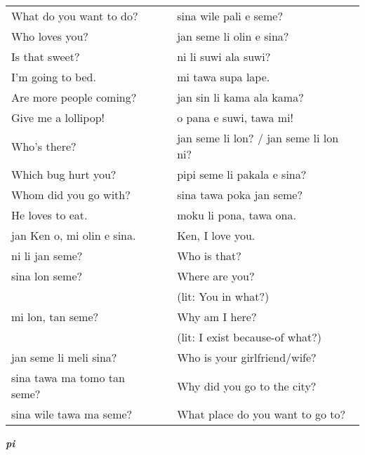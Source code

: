 \begin{supertabular}{p{5,5cm}|ll}
What do you want to do?  && sina wile pali e seme? \\ %
Who loves you?  && jan seme li olin e sina? \\ %
Is that sweet?  && ni li suwi ala suwi? \\ %
I'm going to bed.  && mi tawa supa lape. \\ %
Are more people coming?  && jan sin li kama ala kama? \\ %
Give me a lollipop!  && o pana e suwi, tawa mi! \\ %
Who's there?  && jan seme li lon? / jan seme li lon ni? \\ %
Which bug hurt you?  && pipi seme li pakala e sina? \\ %
Whom did you go with?  && sina tawa poka jan seme? \\ %
He loves to eat.  && moku li pona, tawa ona. \\ %
jan Ken o, mi olin e sina.  && Ken, I love you. \\
ni li jan seme?  && Who is that? \\
sina lon seme?  && Where are you? \\ 
                &&   (lit: You in what?) \\ %
mi lon, tan seme?  && Why am I here? \\ 
                &&   (lit: I exist because-of what?) \\ %
jan seme li meli sina?  && Who is your girlfriend/wife? \\
sina tawa ma tomo tan seme?  && Why did you go to the city? \\
sina wile tawa ma seme?  && What place do you want to go to? \\
\end{supertabular} 

\textbf{\textit{pi}} 
\label{'pi'}

